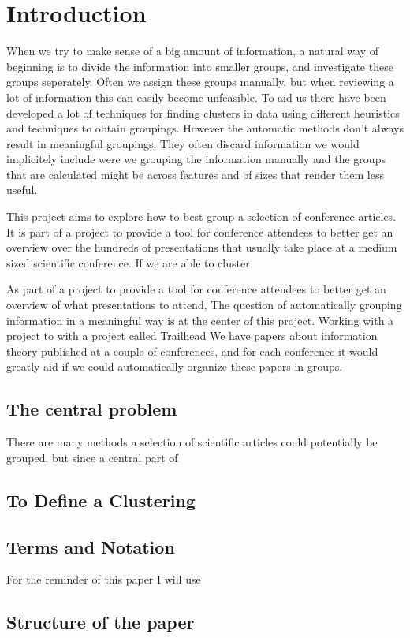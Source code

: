 \section{Introduction}
When we try to make sense of a big amount of information, a natural way 
of beginning is to divide the information into smaller groups, and 
investigate these groups seperately. Often we assign these groups 
manually, but when reviewing a lot of information this can easily become 
unfeasible. To aid us there have been developed a lot of techniques for 
finding clusters in data using different heuristics and techniques to 
obtain groupings. However the automatic methods don't always result in 
meaningful groupings. They often discard information we would 
implicitely include were we grouping the information manually and the 
groups that are calculated might be across features and of sizes that 
render them less useful.

This project aims to explore how to best group a selection of conference 
articles. It is part of a project to provide a tool for conference 
attendees to better get an overview over the hundreds of presentations 
that usually take place at a medium sized scientific conference. If we 
are able to cluster

As part of a project to provide a tool for conference attendees to 
better get an overview of what presentations to attend, The question of 
automatically grouping information in a meaningful way is at the center 
of this project. Working with a project to  with a project called 
Trailhead We have papers about information theory published at a couple 
of conferences, and for each conference it would greatly aid if we could 
automatically organize these papers in groups.

\subsection{The central problem}

There are many methods a selection of scientific articles could 
potentially be grouped, but since a central part of 

\subsection{To Define a Clustering}

\subsection{Terms and Notation}

For the reminder of this paper I will use

\subsection{Structure of the paper}
